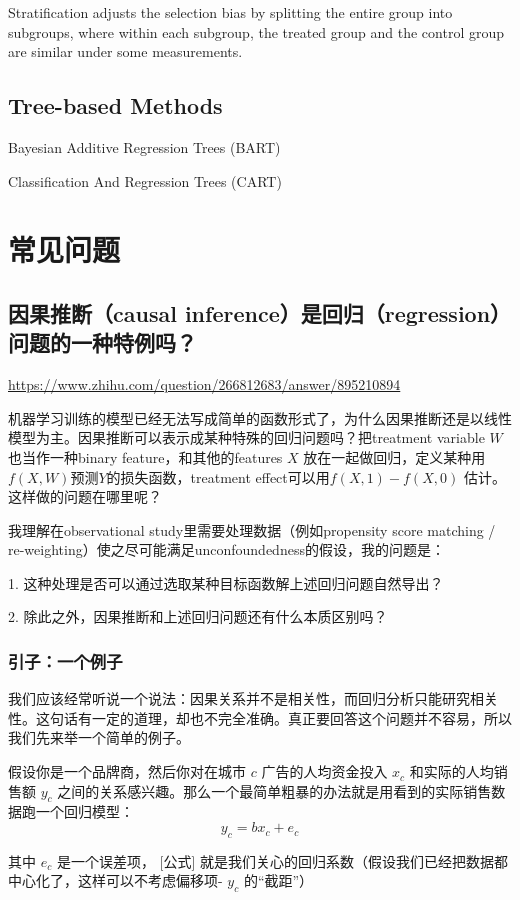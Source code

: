 \documentclass[12pt]{article}
\begin{document}
Stratiﬁcation adjusts the selection bias by splitting the entire group into subgroups, where within each subgroup, the treated group and the control group are similar under some measurements.

\subsection{Tree-based Methods}
Bayesian Additive Regression Trees (BART)

Classiﬁcation And Regression Trees (CART)

\section{常见问题}
\subsection{因果推断（causal inference）是回归（regression）问题的一种特例吗？}
\url{https://www.zhihu.com/question/266812683/answer/895210894}

机器学习训练的模型已经无法写成简单的函数形式了，为什么因果推断还是以线性模型为主。因果推断可以表示成某种特殊的回归问题吗？把treatment variable $W$ 也当作一种binary feature，和其他的features $X$ 放在一起做回归，定义某种用$f(X, W)$预测$Y$的损失函数，treatment effect可以用$f(X, 1) - f(X, 0)$ 估计。这样做的问题在哪里呢？

我理解在observational study里需要处理数据（例如propensity score matching / re-weighting）使之尽可能满足unconfoundedness的假设，我的问题是：

1. 这种处理是否可以通过选取某种目标函数解上述回归问题自然导出？

2. 除此之外，因果推断和上述回归问题还有什么本质区别吗？

\subsubsection{引子：一个例子}
我们应该经常听说一个说法：因果关系并不是相关性，而回归分析只能研究相关性。这句话有一定的道理，却也不完全准确。真正要回答这个问题并不容易，所以我们先来举一个简单的例子。

假设你是一个品牌商，然后你对在城市 $c$ 广告的人均资金投入 $x_c$ 和实际的人均销售额 $y_c$ 之间的关系感兴趣。那么一个最简单粗暴的办法就是用看到的实际销售数据跑一个回归模型：
$$
y_c = bx_c + e_c
$$

其中 $e_c$ 是一个误差项， [公式] 就是我们关心的回归系数（假设我们已经把数据都中心化了，这样可以不考虑偏移项- $y_c$ 的“截距”）
\end{document}
